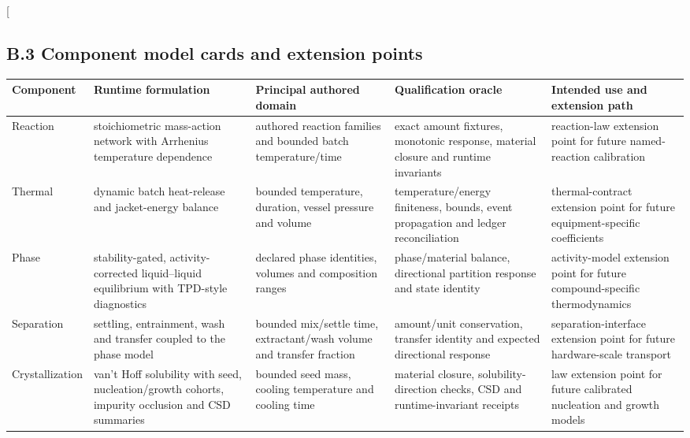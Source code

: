 \documentclass[10pt,twocolumn]{article}
\begin{document}
\clearpage
\twocolumn[
\begin{@twocolumnfalse}
\subsection{B.3 Component model cards and extension points}\label{appendix-b.3-component-model-cards}
\centering
\fontsize{7.6}{8.4}\selectfont
\renewcommand{\arraystretch}{0.88}
\captionsetup{hypcap=false}
\label{tab:component-model-cards}
\begin{tabularx}{\textwidth}{@{}L{0.125\textwidth}L{0.185\textwidth}L{0.18\textwidth}L{0.20\textwidth}Y@{}}
\toprule
Component & Runtime formulation & Principal authored domain & Qualification oracle & Intended use and extension path \\
\midrule
Reaction & stoichiometric mass-action network with Arrhenius temperature dependence & authored reaction families and bounded batch temperature/time & exact amount fixtures, monotonic response, material closure and runtime invariants & reaction-law extension point for future named-reaction calibration \\
Thermal & dynamic batch heat-release and jacket-energy balance & bounded temperature, duration, vessel pressure and volume & temperature/energy finiteness, bounds, event propagation and ledger reconciliation & thermal-contract extension point for future equipment-specific coefficients \\
Phase & stability-gated, activity-corrected liquid--liquid equilibrium with TPD-style diagnostics & declared phase identities, volumes and composition ranges & phase/material balance, directional partition response and state identity & activity-model extension point for future compound-specific thermodynamics \\
Separation & settling, entrainment, wash and transfer coupled to the phase model & bounded mix/settle time, extractant/wash volume and transfer fraction & amount/unit conservation, transfer identity and expected directional response & separation-interface extension point for future hardware-scale transport \\
Crystallization & van't Hoff solubility with seed, nucleation/growth cohorts, impurity occlusion and CSD summaries & bounded seed mass, cooling temperature and cooling time & material closure, solubility-direction checks, CSD and runtime-invariant receipts & law extension point for future calibrated nucleation and growth models \\

\end{tabularx}
\end{@twocolumnfalse}
\end{document}
